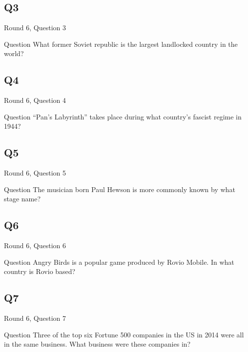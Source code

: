 \documentclass[11pt]{beamer}
\begin{document}
\subsection*{Q3}
\begin{frame}[t]{Round 6, Question 3}
\vspace{2em}
\begin{block}{Question}
What former Soviet republic is the largest landlocked country in the world\@?
\end{block}
\end{frame}
    

\subsection*{Q4}
\begin{frame}[t]{Round 6, Question 4}
\vspace{2em}
\begin{block}{Question}
``Pan's Labyrinth'' takes place during what country's fascist regime in 1944\@?
\end{block}
\end{frame}
    

\subsection*{Q5}
\begin{frame}[t]{Round 6, Question 5}
\vspace{2em}
\begin{block}{Question}
The musician born Paul Hewson is more commonly known by what stage name\@?
\end{block}
\end{frame}
    

\subsection*{Q6}
\begin{frame}[t]{Round 6, Question 6}
\vspace{2em}
\begin{block}{Question}
Angry Birds is a popular game produced by Rovio Mobile. In what country is Rovio based\@?
\end{block}
\end{frame}
    

\subsection*{Q7}
\begin{frame}[t]{Round 6, Question 7}
\vspace{2em}
\begin{block}{Question}
Three of the top six Fortune 500 companies in the US in 2014 were all in the same business. What business were these companies in\@?
\end{block}
\end{frame}
    
\end{document}
